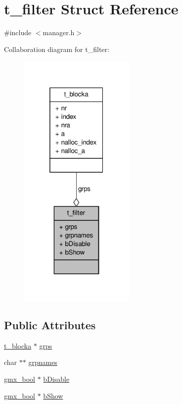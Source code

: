 \hypertarget{structt__filter}{\section{t\-\_\-filter \-Struct \-Reference}
\label{structt__filter}
}


{\ttfamily \#include $<$manager.\-h$>$}



\-Collaboration diagram for t\-\_\-filter\-:
\nopagebreak
\begin{figure}[H]
\begin{center}
\leavevmode
\includegraphics[width=160pt]{structt__filter__coll__graph}
\end{center}
\end{figure}
\subsection*{\-Public \-Attributes}
\begin{DoxyCompactItemize}
\item 
\hyperlink{structt__blocka}{t\-\_\-blocka} $\ast$ \hyperlink{structt__filter_a5e4a0c9e49271af48cdc1f550e553dd6}{grps}
\item 
char $\ast$$\ast$ \hyperlink{structt__filter_a416c3f8c8bd00d04e2cca52e34e57020}{grpnames}
\item 
\hyperlink{include_2types_2simple_8h_a8fddad319f226e856400d190198d5151}{gmx\-\_\-bool} $\ast$ \hyperlink{structt__filter_a59cfe6ac0779100fccb7a29e25979084}{b\-Disable}
\item 
\hyperlink{include_2types_2simple_8h_a8fddad319f226e856400d190198d5151}{gmx\-\_\-bool} $\ast$ \hyperlink{structt__filter_afc604a944609edcfd4cc6bcfca7cdabd}{b\-Show}
\end{DoxyCompactItemize}


